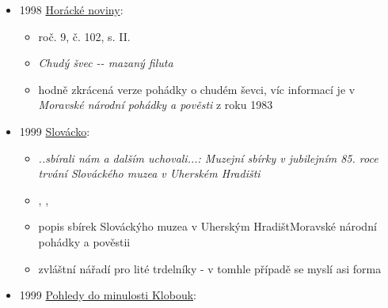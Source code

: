 \begin{itemize}
\begin{itemize}
    \begin{itemize}
    \tightlist
    \item
      popis tradičních pečiv, smažený i pečený
    \item
      trdelníky z kynutýho těsta, pruh těsta se ovine kolem až 30 cm
      dlouhýho kolíku a smaží nebo pečou
    \item
      připravujou se dodnes
    \item
      pekly se výhradně pro šestinedělku do kúta
    \end{itemize}
  \end{itemize}
\item
  1998
  \href{https://www.digitalniknihovna.cz/kkvhb/uuid/uuid:b2adec90-f5a0-4382-991b-083a442300b3}{Horácké
  noviny}:

  \begin{itemize}
  \tightlist
  \item
    roč. 9, č. 102, s. II.
  \item
    \emph{Chudý švec -\/- mazaný filuta}
  \item
    hodně zkrácená verze pohádky o chudém ševci, víc informací je v
    \emph{Moravské národní pohádky a pověsti} z roku 1983
  \end{itemize}
\item
  1999
  \href{https://ceskadigitalniknihovna.cz/view/uuid:57abf773-997c-406c-8ba1-063f2a52d0c4?page=uuid\%3A0ef9ff97-bf5a-11ed-9fa2-001b63bd97ba&fulltext=trdeln\%C3\%ADk\%20OR\%20trdeln\%C3\%ADky\%20OR\%20trdeln\%C3\%ADk\%C5\%AF&source=kfbz}{Slovácko}:

  \begin{itemize}
  \tightlist
  \item
    \emph{..sbírali nám a dalším uchovali...: Muzejní sbírky v
    jubilejním 85. roce trvání Slováckého muzea v Uherském Hradišti}
  \item
     ,  ,
  \item
    popis sbírek Slováckýho muzea v Uherským HradištMoravské národní
    pohádky a pověstii
  \item
    zvláštní nářadí pro lité trdelníky - v tomhle případě se myslí asi
    forma
  \end{itemize}
\item
  1999
  \href{https://ceskadigitalniknihovna.cz/view/uuid:288aee50-92f1-11ec-a3e4-5ef3fc9bb22f?page=uuid\%3A82f08da1-51aa-455c-8d5d-cb64c45aa594&fulltext=trdeln\%C3\%ADk\%20OR\%20trdeln\%C3\%ADky\%20OR\%20trdeln\%C3\%ADk\%C5\%AF&source=nkp}{Pohledy
  do minulosti Klobouk}:


\end{itemize}
